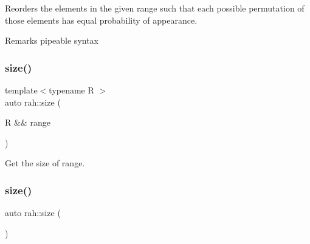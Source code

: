 Reorders the elements in the given range such that each possible permutation of those elements has equal probability of appearance. 

\begin{DoxyRemark}{Remarks}
pipeable syntax
\end{DoxyRemark}

\begin{DoxyCodeInclude}{0}
\end{DoxyCodeInclude}
\mbox{\label{namespacerah_a85af749badb4261aa3c97a1d98134493}} 
\subsubsection{\texorpdfstring{size()}{size()}\hspace{0.1cm}{\footnotesize\ttfamily [1/2]}}
{\footnotesize\ttfamily template$<$typename R $>$ \\
auto rah\+::size (\begin{DoxyParamCaption}\item[{R \&\&}]{range }\end{DoxyParamCaption})}



Get the size of range. 


\begin{DoxyCodeInclude}{0}
\end{DoxyCodeInclude}
\mbox{\label{namespacerah_aaee48fa7a804b4fd19c6a78bdd8d4c85}} 
\subsubsection{\texorpdfstring{size()}{size()}\hspace{0.1cm}{\footnotesize\ttfamily [2/2]}}
{\footnotesize\ttfamily auto rah\+::size (\begin{DoxyParamCaption}{ }\end{DoxyParamCaption})\hspace{0.3cm}{\ttfamily [inline]}}



